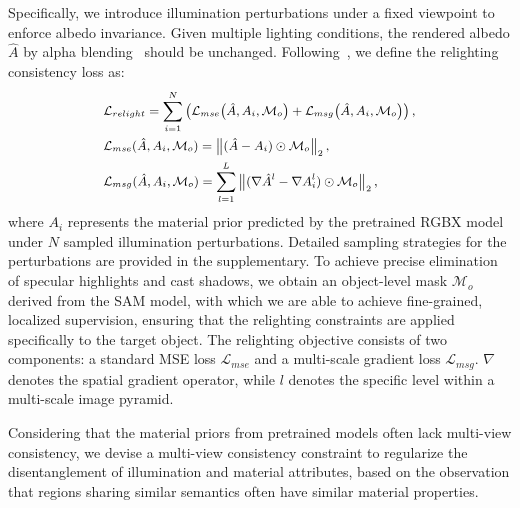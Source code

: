 Specifically, we introduce illumination perturbations under a fixed viewpoint to enforce albedo invariance. Given multiple lighting conditions, the rendered albedo $\hat{A}$ by alpha blending~\cite{liang2024gs} should be unchanged. Following~\cite{careaga2024colorful}, we define the relighting consistency loss as:
\begin{equation}
    \small
\begin{aligned}
&\mathcal{L}_{relight} =  \sum_{i=1}^{N} 
\left(
\mathcal{L}_{mse}\!\left(\hat{A}, A_i, \mathcal{M}_{o}\right)
+ \mathcal{L}_{msg}\!\left(\hat{A}, A_i, \mathcal{M}_{o}\right)
\right), \\
&\mathcal{L}_{mse}(\hat{A}, A_i, \mathcal{M}_{o}) 
= \left\| (\hat{A} - A_i) \odot \mathcal{M}_{o} \right\|_2, \\
&\mathcal{L}_{msg}(\hat{A}, A_i, \mathcal{M}_{o})
= \sum_{l=1}^{L} 
\left\| (\nabla \hat{A}^{l} - \nabla A_i^{l}) \odot \mathcal{M}_{o} \right\|_2,
\end{aligned}
\end{equation}
where $A_i$ represents the material prior predicted by the pretrained RGBX model~\cite{10.1145/3641519.3657445} under $N$ sampled illumination perturbations. Detailed sampling strategies for the perturbations are provided in the supplementary. To achieve precise elimination of specular highlights and cast shadows, we obtain an object-level mask $\mathcal{M}_o$ derived from the SAM model, with which we are able to achieve fine-grained, localized supervision, ensuring that the relighting constraints are applied specifically to the target object. The relighting objective consists of two components: a standard MSE loss $\mathcal{L}_{mse}$ and a multi-scale gradient loss $\mathcal{L}_{msg}$. $\nabla$ denotes the spatial gradient operator, while $l$ denotes the specific level within a multi-scale image pyramid. 





Considering that the material priors from pretrained models often lack multi-view consistency, we devise a multi-view consistency constraint to regularize the disentanglement of illumination and material attributes, based on the observation that regions sharing similar semantics often have similar material properties.

